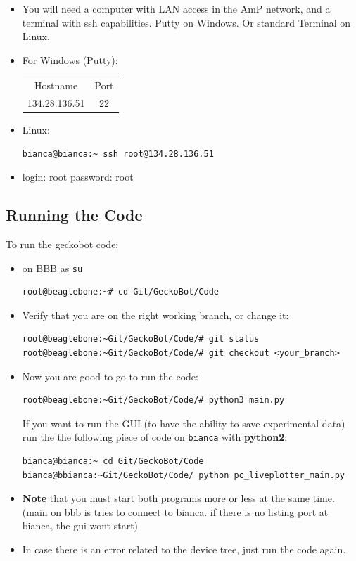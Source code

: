 \documentclass[
	fontsize=10pt
	paper=a4
]{scrartcl}
\begin{document}
\begin{itemize}

\item 	You will need a computer with LAN access in the AmP network, and a terminal with ssh capabilities. Putty on Windows. Or standard Terminal on Linux.

\item For Windows (Putty):
\begin{tabular}{cc}
Hostname & Port \\
134.28.136.51 & 22 \\
\end{tabular}

\item Linux:
\begin{lstlisting}
bianca@bianca:~ ssh root@134.28.136.51
\end{lstlisting}

\item login: root \qquad password: root

\end{itemize}


\subsection{Running the Code}
To run the geckobot code:
\begin{itemize}
\item on BBB as \texttt{su}
\begin{lstlisting}
root@beaglebone:~# cd Git/GeckoBot/Code
\end{lstlisting}

\item Verify that you are on the right working branch, or change it:
\begin{lstlisting}
root@beaglebone:~Git/GeckoBot/Code/# git status
root@beaglebone:~Git/GeckoBot/Code/# git checkout <your_branch>
\end{lstlisting}

\item Now you are good to go to run the code:
\begin{lstlisting}
root@beaglebone:~Git/GeckoBot/Code/# python3 main.py
\end{lstlisting}

If you want to run the GUI (to have the ability to save experimental data) run the the following piece of code on \texttt{bianca} with \textbf{python2}:
\begin{lstlisting}
bianca@bianca:~ cd Git/GeckoBot/Code
bianca@bbianca:~Git/GeckoBot/Code/ python pc_liveplotter_main.py
\end{lstlisting}
\item \textbf{Note} that you must start both programs more or less at the same time. (main on bbb is tries to connect to bianca. if there is no listing port at bianca, the gui wont start)

\item In case there is an error related to the device tree, just run the code again.

\end{itemize}
\end{document}
